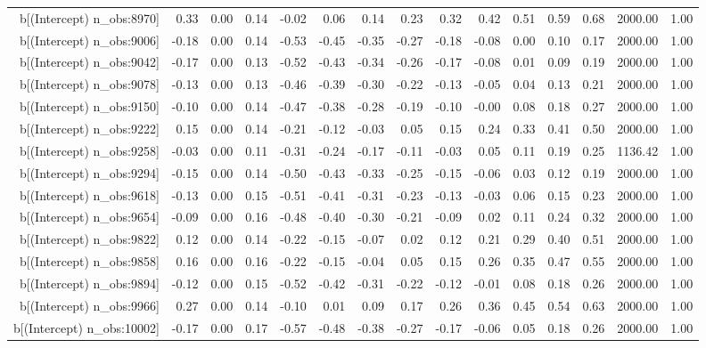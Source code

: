 \begin{table}[ht]
\begin{tabular}{rrrrrrrrrrrrrrr}
  b[(Intercept) n\_obs:8970] & 0.33 & 0.00 & 0.14 & -0.02 & 0.06 & 0.14 & 0.23 & 0.32 & 0.42 & 0.51 & 0.59 & 0.68 & 2000.00 & 1.00 \\ 
  b[(Intercept) n\_obs:9006] & -0.18 & 0.00 & 0.14 & -0.53 & -0.45 & -0.35 & -0.27 & -0.18 & -0.08 & 0.00 & 0.10 & 0.17 & 2000.00 & 1.00 \\ 
  b[(Intercept) n\_obs:9042] & -0.17 & 0.00 & 0.13 & -0.52 & -0.43 & -0.34 & -0.26 & -0.17 & -0.08 & 0.01 & 0.09 & 0.19 & 2000.00 & 1.00 \\ 
  b[(Intercept) n\_obs:9078] & -0.13 & 0.00 & 0.13 & -0.46 & -0.39 & -0.30 & -0.22 & -0.13 & -0.05 & 0.04 & 0.13 & 0.21 & 2000.00 & 1.00 \\ 
  b[(Intercept) n\_obs:9150] & -0.10 & 0.00 & 0.14 & -0.47 & -0.38 & -0.28 & -0.19 & -0.10 & -0.00 & 0.08 & 0.18 & 0.27 & 2000.00 & 1.00 \\ 
  b[(Intercept) n\_obs:9222] & 0.15 & 0.00 & 0.14 & -0.21 & -0.12 & -0.03 & 0.05 & 0.15 & 0.24 & 0.33 & 0.41 & 0.50 & 2000.00 & 1.00 \\ 
  b[(Intercept) n\_obs:9258] & -0.03 & 0.00 & 0.11 & -0.31 & -0.24 & -0.17 & -0.11 & -0.03 & 0.05 & 0.11 & 0.19 & 0.25 & 1136.42 & 1.00 \\ 
  b[(Intercept) n\_obs:9294] & -0.15 & 0.00 & 0.14 & -0.50 & -0.43 & -0.33 & -0.25 & -0.15 & -0.06 & 0.03 & 0.12 & 0.19 & 2000.00 & 1.00 \\ 
  b[(Intercept) n\_obs:9618] & -0.13 & 0.00 & 0.15 & -0.51 & -0.41 & -0.31 & -0.23 & -0.13 & -0.03 & 0.06 & 0.15 & 0.23 & 2000.00 & 1.00 \\ 
  b[(Intercept) n\_obs:9654] & -0.09 & 0.00 & 0.16 & -0.48 & -0.40 & -0.30 & -0.21 & -0.09 & 0.02 & 0.11 & 0.24 & 0.32 & 2000.00 & 1.00 \\ 
  b[(Intercept) n\_obs:9822] & 0.12 & 0.00 & 0.14 & -0.22 & -0.15 & -0.07 & 0.02 & 0.12 & 0.21 & 0.29 & 0.40 & 0.51 & 2000.00 & 1.00 \\ 
  b[(Intercept) n\_obs:9858] & 0.16 & 0.00 & 0.16 & -0.22 & -0.15 & -0.04 & 0.05 & 0.15 & 0.26 & 0.35 & 0.47 & 0.55 & 2000.00 & 1.00 \\ 
  b[(Intercept) n\_obs:9894] & -0.12 & 0.00 & 0.15 & -0.52 & -0.42 & -0.31 & -0.22 & -0.12 & -0.01 & 0.08 & 0.18 & 0.26 & 2000.00 & 1.00 \\ 
  b[(Intercept) n\_obs:9966] & 0.27 & 0.00 & 0.14 & -0.10 & 0.01 & 0.09 & 0.17 & 0.26 & 0.36 & 0.45 & 0.54 & 0.63 & 2000.00 & 1.00 \\ 
  b[(Intercept) n\_obs:10002] & -0.17 & 0.00 & 0.17 & -0.57 & -0.48 & -0.38 & -0.27 & -0.17 & -0.06 & 0.05 & 0.18 & 0.26 & 2000.00 & 1.00 \\ 

\end{tabular}
\end{table}
